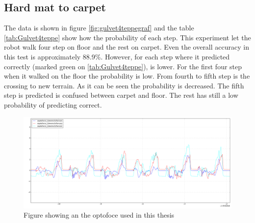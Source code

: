 \documentclass[USenglish]{ifimaster}  %
\begin{document}
\subsection{Hard mat to carpet}
The data is shown in figure \ref{fig:gulvet4teppegraf} and the table \ref{tab:Gulvet4teppe} show how the probability of each step. This experiment let the robot walk four step on floor and the rest on carpet. Even the overall accuracy in this test is approximately 88.9\%. However, for each step where it predicted correctly (marked green on \ref{tab:Gulvet4teppe}), is lower. For the first four step when it walked on the floor the probability is low. From fourth to fifth step is the crossing to new terrain. As it can be seen the probability is decreased. The fifth step is predicted is confused between carpet and floor. The rest has still a low probability of predicting correct.

\begin{figure}[h]
    \centering
    \includegraphics[width=\textwidth,height=\textheight,keepaspectratio]{Figures/MB3_3_Gulvet}
    \caption{Figure showing an the optofoce used in this thesis \cite{OptoforceFig}}
    \label{fig:optoforce}
\end{figure}
\begin{table}[h]
\centering
{}
\caption{Hard mat Teppe}
\label{my-label}
\end{table}
\end{document}
